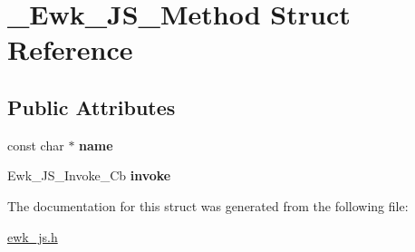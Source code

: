\hypertarget{struct__Ewk__JS__Method}{\section{\+\_\+\+Ewk\+\_\+\+J\+S\+\_\+\+Method Struct Reference}
\label{struct__Ewk__JS__Method}
}
\subsection*{Public Attributes}
\begin{DoxyCompactItemize}
\item 
\hypertarget{struct__Ewk__JS__Method_a3eed091e87140b21d82997057600e9a6}{const char $\ast$ {\bfseries name}}\label{struct__Ewk__JS__Method_a3eed091e87140b21d82997057600e9a6}

\item 
\hypertarget{struct__Ewk__JS__Method_a2324c73f7961af243c46bf1c5c55dd56}{Ewk\+\_\+\+J\+S\+\_\+\+Invoke\+\_\+\+Cb {\bfseries invoke}}\label{struct__Ewk__JS__Method_a2324c73f7961af243c46bf1c5c55dd56}

\end{DoxyCompactItemize}


The documentation for this struct was generated from the following file\+:\begin{DoxyCompactItemize}
\item 
\hyperlink{ewk__js_8h}{ewk\+\_\+js.\+h}\end{DoxyCompactItemize}
